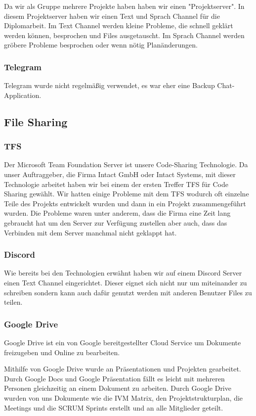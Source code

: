 Da wir als Gruppe mehrere Projekte haben haben wir einen "Projektserver". In diesem Projektserver haben wir einen Text und Sprach Channel für die Diplomarbeit. Im Text Channel werden kleine Probleme, die schnell geklärt werden können, besprochen und Files ausgetauscht. Im Sprach Channel werden gröbere Probleme besprochen oder wenn nötig Planänderungen. 

\subsubsection {Telegram}
Telegram wurde nicht regelmäßig verwendet, es war eher eine Backup Chat-Application. 

\subsection{File Sharing}
\subsubsection {TFS}
Der Microsoft Team Foundation Server ist unsere Code-Sharing Technologie. Da unser Auftraggeber, die Firma Intact GmbH oder Intact Systems, mit dieser Technologie arbeitet haben wir bei einem der ersten Treffer TFS für Code Sharing gewählt. Wir hatten einige Probleme mit dem TFS wodurch oft einzelne Teile des Projekts entwickelt wurden und dann in ein Projekt zusammengeführt wurden. Die Probleme waren unter anderem, dass die Firma eine Zeit lang gebraucht hat um den Server zur Verfügung zustellen aber auch, dass das Verbinden mit dem Server manchmal nicht geklappt hat. 
\subsubsection {Discord}
Wie bereits bei den Technologien erwähnt haben wir auf einem Discord Server einen Text Channel eingerichtet. Dieser eignet sich nicht nur um miteinander zu schreiben sondern kann auch dafür genutzt werden mit anderen Benutzer Files zu teilen. 
\subsubsection {Google Drive}
Google Drive ist ein von Google bereitgestellter Cloud Service um Dokumente freizugeben und Online zu bearbeiten.

Mithilfe von Google Drive wurde an Präsentationen und Projekten gearbeitet. Durch Google Docs und Google Präsentation fällt es leicht mit mehreren Personen gleichzeitig an einem Dokument zu arbeiten. Durch Google Drive wurden von uns Dokumente wie die IVM Matrix, den Projektstrukturplan, die Meetings und die SCRUM Sprints erstellt und an alle Mitglieder geteilt. 
